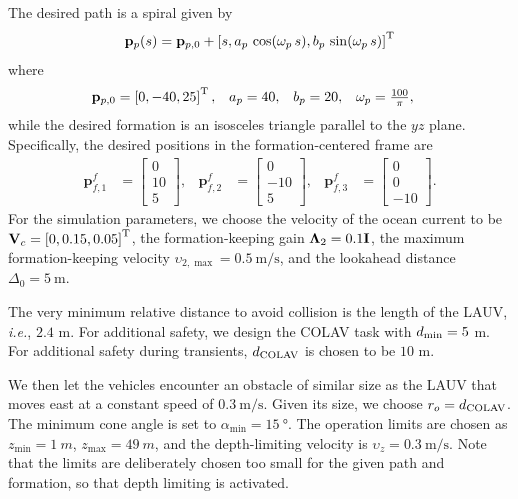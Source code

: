 The desired path is a spiral given by 
\begin{equation}
    \mathbf{p}_p(s) = \mathbf{p}_{p, 0} + \left[s, a_p\,\cos(\omega_p\,s), b_p\,\sin(\omega_p\,s)\right]^{\mathrm{T}}
\end{equation}
where 
\begin{align*}
    \mat{p}_{p, 0} &= \inlinevector{0, -40, 25}, &
    a_p &= 40, &
    b_p &= 20, &
    \omega_p &= \scale[1]{\frac{100}{\pi}},
\end{align*}
while the desired formation is an isosceles triangle parallel to the $yz$ plane.
Specifically, the desired positions in the formation-centered frame are 
\begin{align}
    \mathbf{p}_{f,1}^f &= \begin{bmatrix} 0 \\ 10 \\ 5\end{bmatrix}, &
    \mathbf{p}_{f,2}^f &= \begin{bmatrix} 0 \\ -10 \\ 5\end{bmatrix}, &
    \mathbf{p}_{f,3}^f &= \begin{bmatrix} 0 \\ 0 \\ -10\end{bmatrix}.
\end{align}
For the simulation parameters, we choose the velocity of the ocean current to be $\mathbf{V}_c = \left[0, 0.15, 0.05\right]^{\mathrm{T}}$, the formation-keeping gain $\bm{\Lambda}_2 = 0.1\mathbf{I}$, the maximum formation-keeping velocity $\upsilon_{2, \max} = \SI{0.5}{\meter\per\second}$, and the lookahead distance $\Delta_0 = \SI{5}{\meter}$.



The very minimum relative distance to avoid collision is the length of the LAUV, \emph{i.e.}, $2.4$ m.
For additional safety, we design the COLAV task with $d_{\rm min} = 5$ m.
For additional safety during transients, $d_{\rm COLAV}$ is chosen to be $10$ m.



We then let the vehicles encounter an obstacle of similar size as the LAUV that moves east at a constant speed of $\SI{0.3}{\meter\per\second}$.
Given its size, we choose $r_o = d_{\rm COLAV}$.
The minimum cone angle is set to $\alpha_{\min} = \SI{15}{\degree}$.
The operation limits are chosen as $z_{\min} = \SI{1}{m}$, $z_{\max} = \SI{49}{m}$, and the depth-limiting velocity is $\upsilon_z = \SI{0.3}{\meter\per\second}$.
Note that the limits are deliberately chosen too small for the given path and formation, so that depth limiting is activated.



